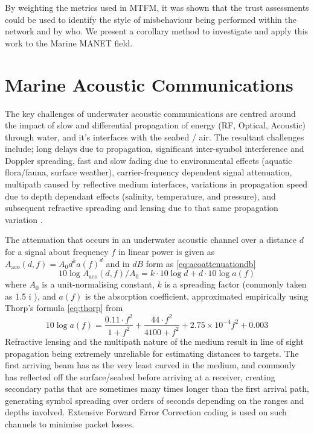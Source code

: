 \documentclass[conference]{IEEEtran}
\begin{document}
By weighting the metrics used in MTFM, it was shown that the trust assessments could be used to identify the style of misbehaviour being performed within the network and by who.
We present a corollary method to investigate and apply this work to the Marine MANET field.


\section{Marine Acoustic Communications}\label{sec:marineacousticnetworks}

The key challenges of underwater acoustic communications are centred around the impact of slow and differential propagation of energy (RF, Optical, Acoustic) through water, and it's interfaces with the seabed / air.
The resultant challenges include; long delays due to propagation, significant inter-symbol interference and Doppler spreading, fast and slow fading due to environmental effects (aquatic flora/fauna, surface weather), carrier-frequency dependent signal attenuation, multipath caused by reflective medium interfaces, variations in propagation speed due to depth dependant effects (salinity, temperature, and pressure), and subsequent refractive spreading and lensing due to that same propagation variation \cite{Partan2006}.

The attenuation that occurs in an underwater acoustic channel over a distance $d$ for a signal about frequency $f$ in linear power is given as $A_{\text{aco}}(d,f) = A_0d^ka(f)^d$ and in $dB$ form as \eqref{eq:acoattenuationdb} 
%
\begin{equation}
  \label{eq:acoattenuationdb}
  10 \log A_{\text{aco}}(d,f)/A_0 = k \cdot 10 \log d + d \cdot 10 \log a(f)
\end{equation}
%
where $A_0$ is a unit-normalising constant, $k$ is a spreading factor (commonly taken as 1.5 i \cite{Stojanovic2011}), and $a(f)$ is the absorption coefficient, approximated empirically using Thorp's formula \eqref{eq:thorp} from \cite{Brekhovskikh1991}
%
\begin{equation}
  \label{eq:thorp}
  10 \log a(f) = \frac{0.11 \cdot f^2}{1+f^2} + \frac{44\cdot f^2}{4100+f^2}+ 2.75\times10^{-4} f^2 + 0.003
\end{equation}
%
Refractive lensing and the multipath nature of the medium result in line of sight propagation being extremely unreliable for estimating distances to targets.
The first arriving beam has as the very least curved in the medium, and commonly has reflected off the surface/seabed before arriving at a receiver, creating secondary paths that are sometimes many times longer than the first arrival path, generating symbol spreading over orders of seconds depending on the ranges and depths involved.
Extensive Forward Error Correction coding is used on such channels to minimise packet losses.
\end{document}
